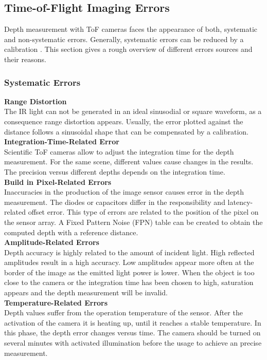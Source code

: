 \subsection{Time-of-Flight Imaging Errors} \label{chap:range_errors}
Depth measurement with ToF cameras faces the appearance of both, systematic and non-systematic errors. Generally, systematic errors can be reduced by a calibration \cite{foix2011lock}. This section gives a rough overview of different errors sources and their reasons. 

\subsubsection{Systematic Errors}
\textbf{Range Distortion}\\
The IR light can not be generated in an ideal sinusodial or square waveform, as a consequence range distortion appears. Usually, the error plotted against the distance follows a sinusoidal shape that can be compensated by a calibration. \\

\textbf{Integration-Time-Related Error}\\
Scientific ToF cameras allow to adjust the integration time for the depth measurement. For the same scene, different values cause changes in the results. The precision versus different depths depends on the integration time.\\

\textbf{Build in Pixel-Related Errors}\\
Inaccuracies in the production of the image sensor causes error in the depth measurement. The diodes or capacitors differ in the responsibility and latency-related offset error. This type of errors are related to the position of the pixel on the sensor array. A Fixed Pattern Noise (FPN) table can be created to obtain the computed depth with a reference distance.\\

\textbf{Amplitude-Related Errors}\\
Depth accuracy is highly related to the amount of incident light. High reflected amplitudes result in a high accuracy. Low amplitudes appear more often at the border of the image as the emitted light power is lower. When the object is too close to the camera or the integration time has been chosen to high, saturation appears and the depth measurement will be invalid.\\

\textbf{Temperature-Related Errors}\\
Depth values suffer from the operation temperature of the sensor. After the activation of the camera it is heating up, until it reaches a stable temperature. In this phase, the depth error changes versus time. The camera should be turned on several minutes with activated illumination before the usage to achieve an precise measurement.

